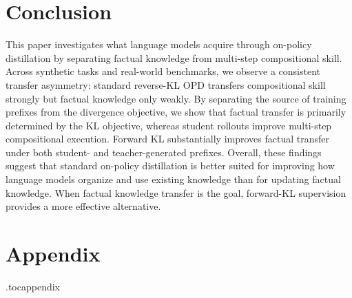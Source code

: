 \documentclass[]{template}
\theoremstyle{plain}
\theoremstyle{definition}
\theoremstyle{remark}
\begin{document}
\section{Conclusion}

This paper investigates what language models acquire through on-policy distillation by separating factual knowledge  from multi-step compositional skill. Across synthetic tasks and real-world benchmarks, we observe a consistent transfer asymmetry:  standard reverse-KL OPD transfers compositional skill strongly but factual knowledge only weakly. By separating the source of training prefixes from the divergence objective, we show that factual transfer is primarily determined by the KL objective, whereas student rollouts improve multi-step compositional execution. Forward KL substantially improves factual transfer under both student- and teacher-generated prefixes. Overall, these findings suggest that standard on-policy distillation is better suited for improving how language models organize and use existing knowledge than for updating factual knowledge. When factual knowledge transfer is the goal, forward-KL supervision provides a more effective alternative. %








\clearpage
\appendix

\section*{Appendix}
\etocdepthtag.toc{appendix}
\begingroup
\hypersetup{linkcolor=black}
\tableofcontents
\endgroup
\clearpage
\end{document}
